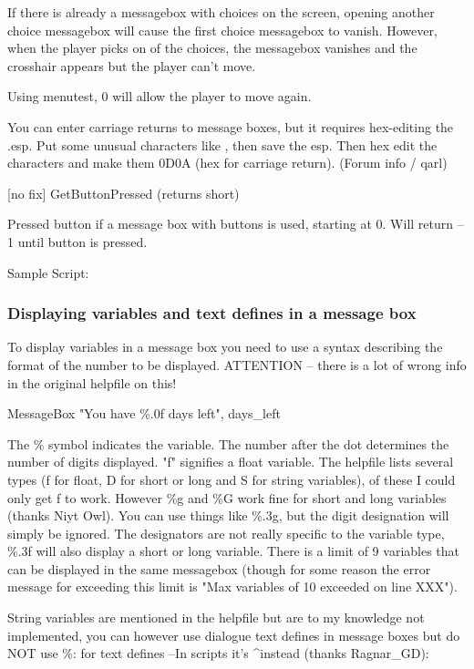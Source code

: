 If there is already a messagebox with choices on the screen, opening
another choice messagebox will cause the first choice messagebox to
vanish. However, when the player picks on of the choices, the messagebox
vanishes and the crosshair appears but the player can't move.

Using menutest, 0 will allow the player to move again.

You can enter carriage returns to message boxes, but it requires
hex-editing the .esp. Put some unusual characters like \textbar\textbar,
then save the esp. Then hex edit the \textbar\textbar{} characters and
make them 0D0A (hex for carriage return). (Forum info / qarl)

{[}no fix{]} GetButtonPressed (returns short)

Pressed button if a message box with buttons is used, starting at 0.
Will return --1 until button is pressed.

Sample Script:



\hypertarget{displaying-variables-and-text-defines-in-a-message-box}{%
\subsubsection{Displaying variables and text defines in a message
box}\label{displaying-variables-and-text-defines-in-a-message-box}}

To display variables in a message box you need to use a syntax
describing the format of the number to be displayed. ATTENTION -- there
is a lot of wrong info in the original helpfile on this!

MessageBox "You have \%.0f days left", days\_left

The \% symbol indicates the variable. The number after the dot
determines the number of digits displayed. "f" signifies a float
variable. The helpfile lists several types (f for float, D for short or
long and S for string variables), of these I could only get f to work.
However \%g and \%G work fine for short and long variables (thanks Niyt
Owl). You can use things like \%.3g, but the digit designation will
simply be ignored. The designators are not really specific to the
variable type, \%.3f will also display a short or long variable. There
is a limit of 9 variables that can be displayed in the same messagebox
(though for some reason the error message for exceeding this limit is
"Max variables of 10 exceeded on line XXX").

String variables are mentioned in the helpfile but are to my knowledge
not implemented, you can however use dialogue text defines in message
boxes but do NOT use \%: for text defines --In scripts it's \^{}instead
(thanks Ragnar\_GD):

